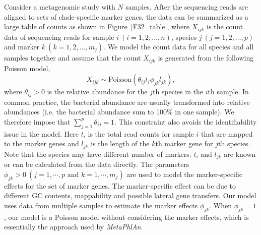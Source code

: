 Consider a metagenomic study with $N$ samples. After the sequencing reads are aligned to sets of clade-specific marker genes, the data can be summarized as a large table of counts as shown in Figure~\ref{F32_table}, where $X_{ijk}$ is  the count data of sequencing reads  for sample $i~(i = 1,2,\ldots,n)$, species $j~(j = 1,2,\ldots,p)$ and marker $k~(k = 1,2,\ldots,m_j)$. 
We model the count data for all species and all samples together and assume that the count  $X_{ijk}$ is generated from the following Poisson model,
\begin{equation*}
X_{ijk} \sim \mbox{Poisson}(\theta_{ij}t_{i}\phi_{jk}l_{jk}),
\end{equation*}
where $\theta_{ij} > 0$ is the relative abundance for the $j$th species in the $i$th sample. In common practice, the bacterial abundance are usually transformed into relative abundances (i.e. the bacterial abundance sum to 100\% in one sample).  We therefore impose that  $\sum_{j=1}^{p} \theta_{ij} = 1$. This constraint also avoids the identifiability issue in the model.  Here $t_i$ is the total read counts for sample $i$ that are mapped to the marker genes and $l_{jk}$ is the  length of the $k$th marker gene for $j$th species. Note that the species may have different number of markers. $t_i$ and $l_{jk}$ are known or can be calculated from the data directly.  The parameters $\phi_{jk} >0 ~(j=1, \cdots, p \textrm{ and } k=1,\cdots, m_j)$ are used to model  the marker-specific effects for the set of  marker genes. The marker-specific effect can  be due to different GC contents, mappability and possible lateral gene transfers.  Our model uses data from multiple samples to estimate the marker effects $\phi_{jk}$.  When $\phi_{jk}=1$, our model is a Poisson model without considering the marker effects, which is essentially the approach used by {\it MetaPhlAn}.



